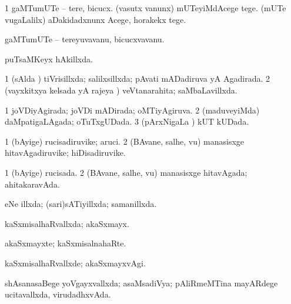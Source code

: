 {{\bentry
{} 
\gl{\sakirx}
\expl{}
\bmng
\bnum
\num{1} gaMTumUTe -- tere, bicucx. 
\banum
{} (vasutx \mo vanunx) mUTeyiMdAcege tege. 
 (mUTe \mo vugaLalilx) aDakidadxnunx Acege, horakekx tege. 
\eanum
\numie
\enum
\emng
\eentry

\bentry
{} 
\gl{\nA}
\expl{}
\bmng
gaMTumUTe -- tereyuvavanu, bicucxvavanu. 
\emng
\eentry

\bentry
{} 
\gl{\gu}
\bmng
puTsaMKeyx hAkillxda. 
\emng
\eentry

\bentry
{} 
\gl{\gu}
\bmng
\bnum
\num{1} (sAlda \vi) tiVrisillxda; salilxsillxda; pAvati mADadiruva yA Agadirada. 
\num{2} (vayxkitxya kelsada yA rajeya \vi) veVtanarahita; saMbaLavillxda. 
\enum
\emng
\eentry

\bentry
{} 
\gl{\gu}
\expl{}
\bmng
\bnum
\num{1} joVDiyAgirada; joVDi mADirada; oMTiyAgiruva. 
\num{2} (maduveyiMda) daMpatigaLAgada; oTuTxgUDada. 
\num{3} (pArxNigaLa \vi) kUT kUDada. 
\enum
\emng
\eentry

\bentry
{} 
\gl{\nA}
\expl{}
\bmng
\bnum
\num{1} (bAyige) rucisadiruvike; aruci. 
\num{2} (BAvane, salhe, \mo vu) manasisxge hitavAgadiruvike; hiDisadiruvike. 
\enum
\emng
\eentry

\bentry
{} 
\gl{\gu}
\expl{}
\bmng
\bnum
\num{1} (bAyige) rucisada. 
\num{2} (BAvane, salhe, \mo vu) manasisxge hitavAgada; ahitakaravAda. 
\enum
\emng
\eentry

\bentry
{} 
\gl{\nA}
\expl{}
\bmng
{} 
\emng
\eentry

\bentry
{} 
\gl{\gu}
\expl{}
\bmng
eNe illxda; (sari)sATiyillxda; samanillxda. 
\emng
\eentry

\bentry
{} 
\gl{\gu}
\expl{}
\bmng
kaSxmisalhaRvallxda; akaSxmayx. 
\emng
\eentry

\bentry
{} 
\gl{\nA}
\expl{}
\bmng
akaSxmayxte; kaSxmisalnahaRte. 
\emng
\eentry

\bentry
{} 
\gl{\kirxvi}
\expl{}
\bmng
kaSxmisalhaRvallxde; akaSxmayxvAgi. 
\emng
\eentry

\bentry
{} 
\gl{\gu}
\expl{}
\bmng
shAsanasaBege yoVgayxvallxda; asaMsadiVya; pAliRmeMTina mayARdege ucitavallxda, virudadhxvAda. 
\emng

}}
